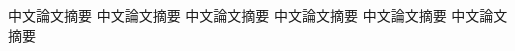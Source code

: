 
\begin{zhAbstract}
    中文論文摘要 中文論文摘要 中文論文摘要
    中文論文摘要 中文論文摘要 中文論文摘要
    
    \zhAbsKeywords
\end{zhAbstract}
